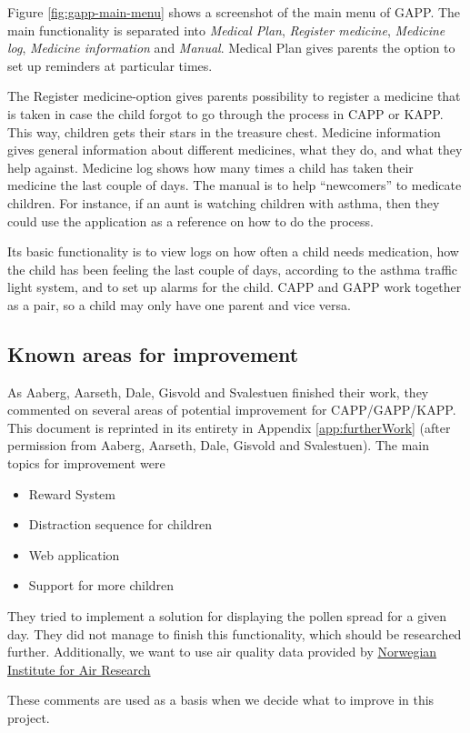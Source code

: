 Figure \ref{fig:gapp-main-menu} shows a screenshot of the main menu of GAPP. The main functionality is separated into 
\emph{Medical Plan}, \emph{Register medicine}, \emph{Medicine log}, \emph{Medicine information} and \emph{Manual}. 
Medical Plan gives parents the option to set up reminders at particular times. 

The Register medicine-option gives parents possibility to register a medicine that is taken in case the child forgot to go through the process in CAPP or KAPP. This way, children gets their stars in the treasure chest. 
Medicine information gives general information about different medicines, what they do, and what they help against.  
Medicine log shows how many times a child has taken their medicine the last couple of days.
The manual is to help ``newcomers'' to medicate children. For instance, if an aunt is watching children with asthma, then they could use the application as a reference on how to do the process. 
        

Its basic functionality is to view logs on how often a child needs medication, how the child has been feeling the last couple of days, according to the asthma traffic light system, and to set up alarms for the child. 
CAPP and GAPP work together as a pair, so a child may only have one parent and vice versa. %


\subsection{Known areas for improvement}
\label{sec:improvements}
As Aaberg, Aarseth, Dale, Gisvold and Svalestuen finished their work, they commented on several areas of potential improvement for CAPP/GAPP/KAPP. This document is reprinted in its entirety in Appendix \ref{app:furtherWork} (after permission from Aaberg, Aarseth, Dale, Gisvold and Svalestuen). The main topics for improvement were
\begin{itemize}
\item{Reward System}
\item{Distraction sequence for children}
\item{Web application}
\item{Support for more children}
\end{itemize}

They tried to implement a solution for displaying the pollen spread for a given day. They did not manage to finish this functionality, which should be researched further. Additionally, we want to use air quality data provided by \href{http://luftkvalitet.info}{Norwegian Institute for Air Research} 

These comments are used as a basis when we decide what to improve in this project. 








